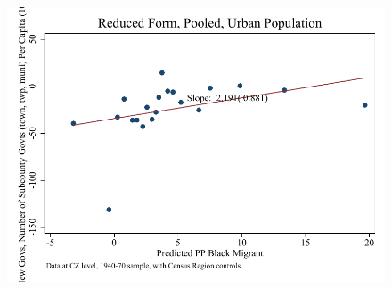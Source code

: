 \documentclass{article}
\begin{document}
\begin{figure}
\centering
\includegraphics{figures/simplefigs/pooled_gen_subcounty_pc_C3_urban_rf.pdf}
\end{figure}
\clearpage
\end{document}
